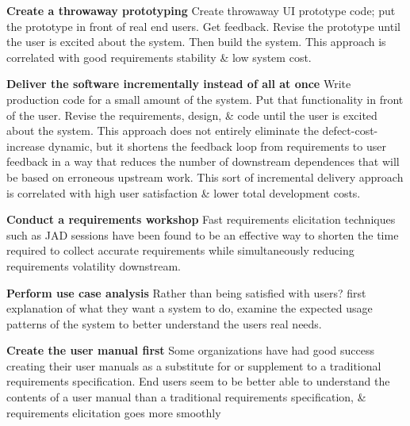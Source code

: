 \documentclass{report}
\begin{document}
\noindent\textbf{Create a throwaway prototyping}\newline
Create throwaway UI prototype code; put the prototype in front of real end users. Get feedback. Revise the prototype until the user is excited about the system. Then build the system. This approach is correlated with good requirements stability \& low system cost.\newline

\noindent\textbf{Deliver the software incrementally instead of all at once}\newline
Write production code for a small amount of the system. Put that functionality in front of the user. Revise the requirements, design, \& code until the user is excited about the system. This approach does not entirely eliminate the defect-cost-increase dynamic, but it shortens the feedback loop from requirements to user feedback in a way that reduces the number of downstream dependences that will be based on erroneous upstream work. This sort of incremental delivery approach is correlated with high user satisfaction \& lower total development costs.\newline

\noindent\textbf{Conduct a requirements workshop}\newline
Fast requirements elicitation techniques such as JAD sessions have been found to be an effective way to shorten the time required to collect accurate requirements while simultaneously reducing requirements volatility downstream.\newline

\noindent\textbf{Perform use case analysis}\newline
Rather than being satisfied with users? first explanation of what they want a system to do, examine the expected usage patterns of the system to better understand the users real needs.\newline

\noindent\textbf{Create the user manual first}\newline
Some organizations have had good success creating their user manuals as a substitute for or supplement to a traditional requirements specification. End users seem to be better able to understand the contents of a user manual than a traditional requirements specification, \& requirements elicitation goes more smoothly
\end{document}
